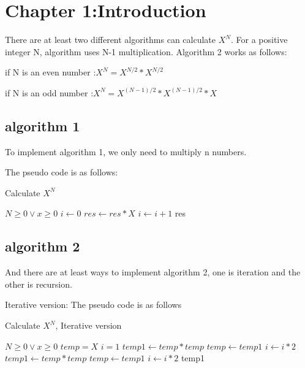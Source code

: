 \documentclass{article}
\begin{document}
\newpage
\tableofcontents

\newpage
{}%

\section{Chapter 1:Introduction}
There are at least two different algorithms can calculate $X^N$. For a positive integer N, algorithm uses N-1 multiplication. Algorithm 2 works as follows: 
\par if N is an even number :$X^N = X^{N/2} * X^{N/2}$
\par if N is an odd number :$X^N = X^{(N-1)/2} * X^{(N-1)/2} * X$
\subsection{ algorithm 1}
\par To implement algorithm 1,  we only need to multiply n numbers. 
 \par The pseudo code is as follows:
\begin{algorithm} 
\setcounter{algorithm}{0}
	\caption{Calculate $X^N$} 
	\label{alg3} 
	\begin{algorithmic}
		\REQUIRE $N \geq 0 \vee x \geq 0$ 
		\STATE $i \gets 0$ 
		\STATE $res \gets res*X$ 
		\STATE $i \gets i+1$ 
		\ENDIF
		\RETURN res
	\end{algorithmic} 
\end{algorithm}

\subsection{ algorithm 2}
\par And there are at least ways to implement algorithm 2, one is iteration and the other is recursion.
\par Iterative version: The pseudo code is as follows
\newpage
\begin{algorithm} 
\setcounter{algorithm}{1}
	\caption{Calculate $X^N$, Iterative version} 
	\label{alg3} 
	\begin{algorithmic}
		\REQUIRE $N \geq 0 \vee x \geq 0$ 
		\STATE $temp=X$
		\STATE $i = 1$
		\IF{$N \ mod\ 2 == 0$} 
		\IF{$i \ < N$}
		\STATE $temp1 \gets temp * temp$ 
		\STATE $temp \gets temp1$ 
		\STATE $i \gets i * 2$ 
		\ENDIF
		\ELSE 
		\IF{$N \ mod\ 2 == 0$} 
		\STATE $temp1 \gets temp * temp$ 
		\STATE $temp \gets temp1$ 
		\STATE $i \gets i * 2$ 
		\ENDIF
		\ENDIF  
		\RETURN temp1
	\end{algorithmic} 
\end{algorithm}
\end{document}
